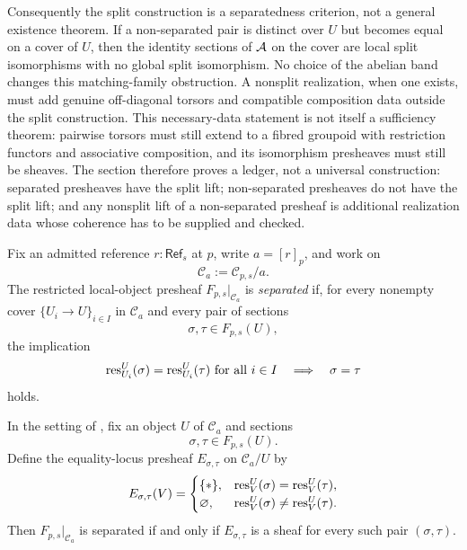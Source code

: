 Consequently the split construction is a separatedness criterion, not a general
existence theorem. If a non-separated pair is distinct over $U$ but becomes
equal on a cover of $U$, then the identity sections of $\mathcal{A}$ on the cover are
local split isomorphisms with no global split isomorphism. No choice of the
abelian band changes this matching-family obstruction. A nonsplit realization,
when one exists, must add genuine off-diagonal torsors and compatible
composition data outside the split construction. This necessary-data statement
is not itself a sufficiency theorem: pairwise torsors must still extend to a
fibred groupoid with restriction functors and associative composition, and its
isomorphism presheaves must still be sheaves. The section therefore proves a
ledger, not a universal construction: separated presheaves have the split lift;
non-separated presheaves do not have the split lift; and any nonsplit lift of a
non-separated presheaf is additional realization data whose coherence has to be
supplied and checked.

\begin{definition}\label{def:slice-separated-local-object}
Fix an admitted reference $r:\mathsf{Ref}_s$ at $p$, write $a=[r]_p$, and work on
\[
\mathcal C_a:=\mathcal C_{p,s}/a.
\]
The restricted local-object presheaf $F_{p,s}|_{\mathcal C_a}$ is \emph{separated} if, for every nonempty cover $\{U_i\to U\}_{i\in I}$ in $\mathcal C_a$ and every pair of sections
\[
\sigma,\tau\in F_{p,s}(U),
\]
the implication
\[
\res_{U_i}^{U}(\sigma)=\res_{U_i}^{U}(\tau)\ \text{for all }i\in I
\quad\Longrightarrow\quad
\sigma=\tau
\]
holds.
\end{definition}

\begin{lemma}\label{lem:equality-loci-separated}
In the setting of , fix an object $U$ of $\mathcal C_a$ and sections
\[
\sigma,\tau\in F_{p,s}(U).
\]
Define the equality-locus presheaf $E_{\sigma,\tau}$ on $\mathcal C_a/U$ by
\[
E_{\sigma,\tau}(V)=
\begin{cases}
\{*\}, & \mathrm{res}_V^U(\sigma)=\mathrm{res}_V^U(\tau),\\
\varnothing, & \mathrm{res}_V^U(\sigma)\neq\mathrm{res}_V^U(\tau).
\end{cases}
\]
Then $F_{p,s}|_{\mathcal C_a}$ is separated if and only if $E_{\sigma,\tau}$ is a sheaf for every such pair $(\sigma,\tau)$.
\end{lemma}

